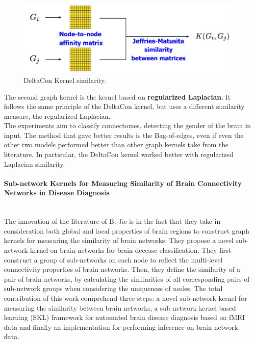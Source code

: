 \begin{figure}[htbp]
	\centering
	\includegraphics[scale=0.8]{Immagini/supervised2.PNG}
	\caption{DeltaCon Kernel similarity.}
	\label{fig:diagram14}
\end{figure}

The second graph kernel is the kernel based on \textbf{regularized Laplacian}. It follows the same principle of the DeltaCon kernel, but uses a different similarity measure, the regularized Laplacian.
\\

The experiments aim to classify connectomes, detecting the gender of the brain in input. The method that gave better results is the Bag-of-edges, even if even the other two models performed better than other graph kernels take from the literature. In particular, the DeltaCon kernel worked better with regularized Laplacian similarity.

\paragraph{Sub-network Kernels for Measuring Similarity of Brain Connectivity Networks in Disease Diagnosis}\
\\

The innovation of the literature of B. Jie \cite{Jie2018} is in the fact that they take in consideration both global and local properties of brain regions to construct graph kernels for measuring the similarity of brain networks. They propose a novel sub-network kernel on brain networks for brain decease classification. They first construct a group of sub-networks on each node to reflect the multi-level connectivity properties of brain networks. Then, they define the similarity of a pair of brain networks, by calculating the similarities of all corresponding pairs of sub-network groups when considering the uniqueness of nodes. The total contribution of this work comprehend three steps: a novel sub-network kernel for measuring the similarity between brain networks, a sub-network kernel based learning (SKL) framework for automated brain disease diagnosis based on fMRI data and finally an implementation for performing inference on brain network data.
\\

